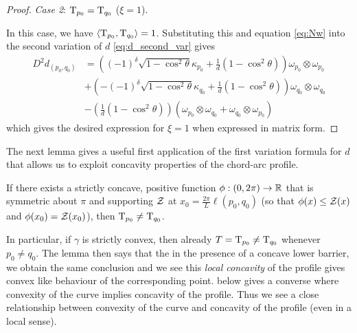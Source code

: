 \documentclass[a4paper, 12pt]{amsart}
\begin{document}
\begin{proof}
\emph{Case 2}: $\operatorname{T}_{p_0} = \operatorname{T}_{q_0}$ ($\xi = 1$).

In this case, we have $\left\langle \operatorname{T}_{p_0},\operatorname{T}_{q_0} \right\rangle = 1$. Substituting this and equation \eqref{eq:Nw} into the second variation of $d$ \eqref{eq:d_second_var} gives
\begin{align*}
D^2d_{(p_0,q_0)} &=  \left((-1)^{\delta} \sqrt{1-\cos^2\theta}\kappa_{p_0} + \frac{1}{d}(1 - \cos^2\theta) \right) \omega_{p_0} \otimes \omega_{p_0} \\
&+ \left(-(-1)^{\delta} \sqrt{1-\cos^2\theta} \kappa_{q_0} + \frac{1}{d}(1 - \cos^2\theta) \right) \omega_{q_0} \otimes \omega_{q_0} \\
&- \left(\frac{1}{d}(1 - \cos^2\theta) \right) \left(\omega_{p_0} \otimes \omega_{q_0} + \omega_{q_0} \otimes \omega_{p_0} \right)
\end{align*}
which gives the desired expression for $\xi=1$ when expressed in matrix form.

\end{proof}

The next lemma gives a useful first application of the first variation formula for $d$ that allows us to exploit concavity properties of the chord-arc profile. 

\begin{lemma}
\label{lem:concave_barrier}
If there exists a strictly concave, positive function $\phi: (0, 2\pi) \to \mathbb{R}$ that is symmetric about $\pi$ and supporting $\operatorname{\mathcal{Z}}$ at $x_0= \tfrac{2\pi}{L} \ell(p_0,q_0)$ (so that $\phi(x) \leq \operatorname{\mathcal{Z}}(x)$ and $\phi(x_0)=\operatorname{\mathcal{Z}}(x_0)$), then $\operatorname{T}_{p_0} \ne \operatorname{T}_{q_0}$.
\end{lemma}

\begin{rem}
In particular, if $\gamma$ is strictly convex, then already \(T=\operatorname{T}_{p_0} \ne \operatorname{T}_{q_0}\) whenever \(p_0 \ne q_0\). The lemma then says that the in the presence of a concave lower barrier, we obtain the same conclusion and we see this \emph{local concavity} of the profile gives convex like behaviour of the corresponding point.  below gives a converse where convexity of the curve implies concavity of the profile. Thus we see a close relationship between convexity of the curve and concavity of the profile (even in a local sense).
\end{rem}
\end{document}
